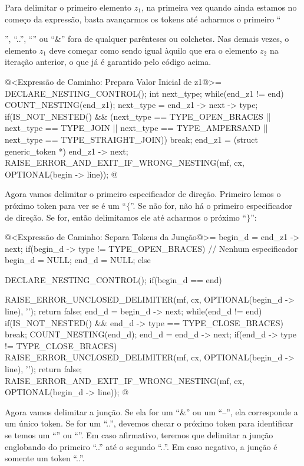 Para delimitar o primeiro elemento $z_1$, na primeira vez quando ainda
estamos no começo da expressão, basta avançarmos os tokens até
acharmos o primeiro ``{'', ``..'', ``\-\-'' ou ``\&'' fora de qualquer
parênteses ou colchetes. Nas demais vezes, o elemento $z_1$ deve
começar como sendo igual àquilo que era o elemento $z_2$ na iteração
anterior, o que já é garantido pelo código acima.

\iniciocodigo
@<Expressão de Caminho: Prepara Valor Inicial de z1@>=
{
  DECLARE_NESTING_CONTROL();
  int next_type;
  while(end_z1 != end){
    COUNT_NESTING(end_z1);
    next_type = end_z1 -> next -> type;
    if(IS_NOT_NESTED() &&
       (next_type == TYPE_OPEN_BRACES || next_type == TYPE_JOIN ||
        next_type == TYPE_AMPERSAND || next_type == TYPE_STRAIGHT_JOIN))
      break;
    end_z1 = (struct generic_token *) end_z1 -> next;
  }
  RAISE_ERROR_AND_EXIT_IF_WRONG_NESTING(mf, cx, OPTIONAL(begin -> line));
}
@
\fimcodigo

Agora vamos delimitar o primeiro especificador de direção. Primeiro
lemos o próximo token para ver se é um ``$\{$''. Se não for, não há o
primeiro especificador de direção. Se for, então delimitamos ele até
acharmos o próximo ``$\}$'':

\iniciocodigo
@<Expressão de Caminho: Separa Tokens da Junção@>=
begin_d = end_z1 -> next;
if(begin_d -> type != TYPE_OPEN_BRACES){ // Nenhum especificador
  begin_d = NULL;
  end_d = NULL;
}
else{
  DECLARE_NESTING_CONTROL();
  if(begin_d == end){
    RAISE_ERROR_UNCLOSED_DELIMITER(mf, cx, OPTIONAL(begin_d -> line), '{');
    return false;
  }
  end_d = begin_d -> next;
  while(end_d != end){
    if(IS_NOT_NESTED() && end_d -> type == TYPE_CLOSE_BRACES)
      break;
    COUNT_NESTING(end_d);
    end_d = end_d -> next;
  }
  if(end_d -> type != TYPE_CLOSE_BRACES){
    RAISE_ERROR_UNCLOSED_DELIMITER(mf, cx, OPTIONAL(begin_d -> line), '{');
    return false;
  }
  RAISE_ERROR_AND_EXIT_IF_WRONG_NESTING(mf, cx, OPTIONAL(begin_d -> line));
}
@
\fimcodigo

Agora vamos delimitar a junção. Se ela for um ``\&'' ou um ``--'', ela
corresponde a um único token. Se for um ``..'', devemos checar o
próximo token para identificar se temos um ``''
ou ``''. Em caso afirmativo, teremos que delimitar
a junção englobando do primeiro ``..'' até o segundo ``..''. Em caso
negativo, a junção é somente um token ``..''.

}}}
